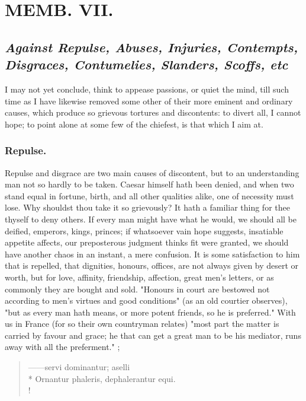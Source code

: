 {\chapter{ MEMB. VII.}


\section[Against Repulse, Abuses, Injuries\ldots{}]{\emph{Against Repulse, Abuses, Injuries, Contempts, Disgraces, Contumelies, Slanders, Scoffs, etc}}


I may not yet conclude, think to appease passions, or quiet the mind, till such time as I have likewise removed some other of their more eminent and ordinary causes, which produce so grievous tortures and discontents: to divert all, I cannot hope; to point alone at some few of the chiefest, is that which I aim at.

\subsection{Repulse.}
Repulse and disgrace are two main causes of discontent, but to an understanding man not so hardly to be taken. Caesar himself hath been denied, and when two stand equal in fortune, birth, and all other qualities alike, one of necessity must lose. Why shouldst thou take it so grievously? It hath a familiar thing for thee thyself to deny others. If every man might have what he would, we should all be deified, emperors, kings, princes; if whatsoever vain hope suggests, insatiable appetite affects, our preposterous judgment thinks fit were granted, we should have another chaos in an instant, a mere confusion. It is some satisfaction to him that is repelled, that dignities, honours, offices, are not always given by desert or worth, but for love, affinity, friendship, affection, great men's letters, or as commonly they are bought and sold. "Honours in court are bestowed not according to men's virtues and good conditions" (as an old courtier observes), "but as every man hath means, or more potent friends, so he is preferred." With us in France (for so their own countryman relates) "most part the matter is carried by favour and grace; he that can get a great man to be his mediator, runs away with all the preferment." ;

\begin{latin}
\begin{verse}%
------servi dominantur; aselli\\*
Ornantur phaleris, dephalerantur equi.\\!
\end{verse}%
\end{latin}

}
